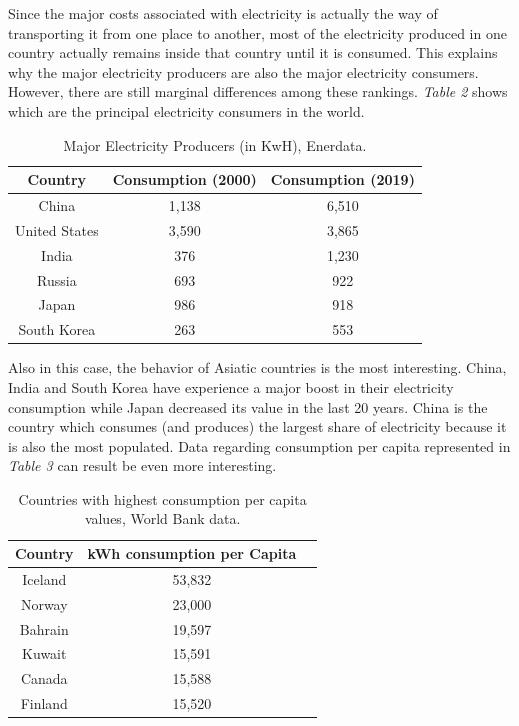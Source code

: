 \documentclass{book}
\begin{document}
Since the major costs associated with electricity is actually the way of transporting it from one place to another, most of the electricity produced in one country actually remains inside that country until it is consumed. This explains why the major electricity producers are also the major electricity consumers. However, there are still marginal differences among these rankings. \textit{Table 2} shows which are the principal electricity consumers in the world.

\bigskip
\begin{table}[H]
\begin{center}
\begin{tabular}{|c|c|c|}
\hline
Country & Consumption (2000) & Consumption (2019)\\
\hline
China & 1,138 & 6,510\\
United States & 3,590 & 3,865\\
India & 376 & 1,230\\
Russia & 693 & 922\\
Japan & 986 & 918\\
South Korea & 263 & 553\\
\hline
\end{tabular}
\caption{Major Electricity Producers (in KwH), Enerdata.}
\end{center}
\end{table}

Also in this case, the behavior of Asiatic countries is the most interesting. China, India and South Korea have experience a major boost in their electricity consumption while Japan decreased its value in the last 20 years. China is the country which consumes (and produces) the largest share of electricity because it is also the most populated. Data regarding consumption per capita represented in \textit{Table 3} can result be even more interesting.

\bigskip
\begin{table}[H]
\begin{center}
\begin{tabular}{|c|c|c|}
\hline
Country & kWh consumption per Capita\\
\hline
Iceland & 53,832\\
Norway & 23,000\\
Bahrain & 19,597\\
Kuwait & 15,591\\
Canada & 15,588\\
Finland & 15,520\\
\hline
\end{tabular}
\caption{Countries with highest consumption per capita values, World Bank data.}
\end{center}
\end{table}
\end{document}
